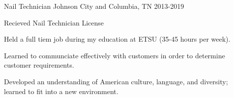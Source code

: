 

\begin{cventries}

  \cventry
    {Nail Technician} %
    {} %
    {Johnson City and Columbia, TN} %
    {2013-2019} %
    {
      \begin{cvitems} %
      \item Recieved Nail Technician License
      \item Held a full tiem job during my education at ETSU (35-45 hours per week).
      \item Learned to communciate effectively with customers in order to determine customer requirements.
      \item Developed an understanding of American culture, language, and diversity; learned to fit into a new environment.
      \end{cvitems}
    }


\end{cventries}
